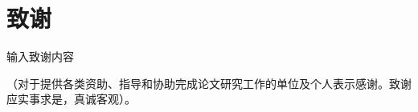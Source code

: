 \newpage







\section*{\hei{}致\quad 谢}

    \song{}
    输入致谢内容
    
    （对于提供各类资助、指导和协助完成论文研究工作的单位及个人表示感谢。致谢应实事求是，真诚客观）。
 



\setcounter{secnumdepth}{4}


